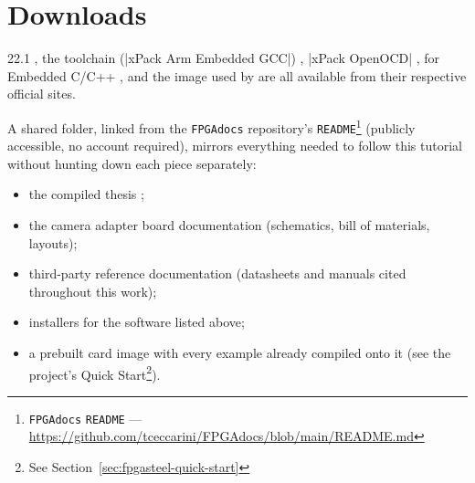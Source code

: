 \chapter{Downloads}
\label{chap:fpgasteel-downloads}

 22.1 \cite{ALTERA-QUARTUS}, the  toolchain (|xPack Arm Embedded GCC|) \cite{XPACK-ARM-GCC}, |xPack OpenOCD| \cite{XPACK-OPENOCD},   for Embedded C/C++ \cite{ECLIPSE-EMBED-CDT}, and the  image \cite{UBUNTU-2204} used by  are all available from their respective official sites.

A shared folder, linked from the \texttt{FPGAdocs} repository's \texttt{README}\footnote{\texttt{FPGAdocs} \texttt{README} --- \url{https://github.com/tceccarini/FPGAdocs/blob/main/README.md}} (publicly accessible, no account required), mirrors everything needed to follow this tutorial without hunting down each piece separately:

\begin{itemize}
    \item the compiled thesis ;
    \item the camera adapter board documentation (schematics, bill of materials,  layouts);
    \item third-party reference documentation (datasheets and manuals cited throughout this work);
    \item installers for the software listed above;
    \item a prebuilt  card image with every  example already compiled onto it (see the project's Quick Start\footnote{See Section~\ref{sec:fpgasteel-quick-start}}).
\end{itemize}
